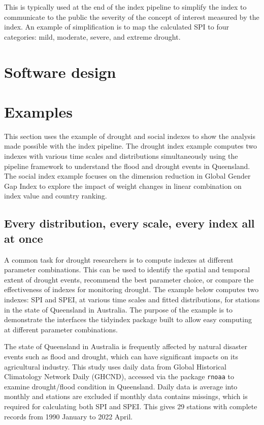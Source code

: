 \documentclass[
]{interact}
\begin{document}
This is typically used at the end of the index pipeline to simplify the
index to communicate to the public the severity of the concept of
interest measured by the index. An example of simplification is to map
the calculated SPI to four categories: mild, moderate, severe, and
extreme drought.

\hypertarget{sec-dev}{%
\section{Software design}\label{sec-dev}}

\hypertarget{sec-examples}{%
\section{Examples}\label{sec-examples}}

This section uses the example of drought and social indexes to show the
analysis made possible with the index pipeline. The drought index
example computes two indexes with various time scales and distributions
simultaneously using the pipeline framework to understand the flood and
drought events in Queensland. The social index example focuses on the
dimension reduction in Global Gender Gap Index to explore the impact of
weight changes in linear combination on index value and country ranking.

\hypertarget{every-distribution-every-scale-every-index-all-at-once}{%
\subsection{Every distribution, every scale, every index all at
once}\label{every-distribution-every-scale-every-index-all-at-once}}

A common task for drought researchers is to compute indexes at different
parameter combinations. This can be used to identify the spatial and
temporal extent of drought events, recommend the best parameter choice,
or compare the effectiveness of indexes for monitoring drought. The
example below computes two indexes: SPI and SPEI, at various time scales
and fitted distributions, for stations in the state of Queensland in
Australia. The purpose of the example is to demonstrate the interfaces
the tidyindex package built to allow easy computing at different
parameter combinations.

The state of Queensland in Australia is frequently affected by natural
disaster events such as flood and drought, which can have significant
impacts on its agricultural industry. This study uses daily data from
Global Historical Climatology Network Daily (GHCND), accessed via the
package \texttt{rnoaa} to examine drought/flood condition in Queensland.
Daily data is average into monthly and stations are excluded if monthly
data contains missings, which is required for calculating both SPI and
SPEI. This gives 29 stations with complete records from 1990 January to
2022 April.
\end{document}
